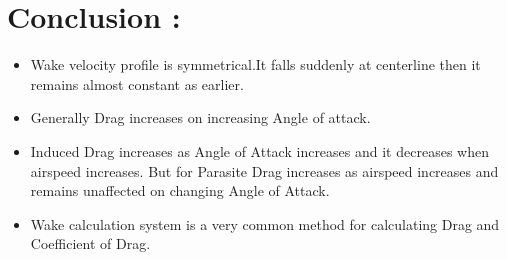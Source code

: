 \documentclass[12pt,a4paper]{article}
\begin{document}
\section{Conclusion :}
\begin{itemize}
    \item Wake velocity profile is symmetrical.It falls suddenly at centerline then it remains almost constant as earlier.
    \item Generally Drag increases on increasing Angle of attack. 
    \item Induced Drag increases as Angle of Attack increases and it decreases when airspeed increases. But for Parasite Drag increases as airspeed increases and remains unaffected on changing Angle of Attack.
    \item Wake calculation system is a very common method for calculating Drag and Coefficient of Drag.
\end{itemize}
\end{document}
